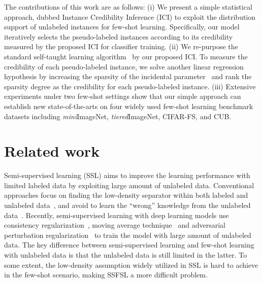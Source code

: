 \documentclass[10pt,letterpaper,twocolumn]{article}
\newcommand{\mypar}[1]{\smallskip\noindent {\bf #1}\enskip}
\begin{document}
The contributions of this work are as follows:
(i) 
We present a simple statistical approach, dubbed Instance Credibility Inference (ICI) to exploit the distribution support of unlabeled instances for few-shot learning. 
Specifically, our model iteratively selects the pseudo-labeled instances according to its credibility measured by the proposed ICI for classifier training.
(ii) 
We re-purpose the standard self-taught learning algorithm~\cite{self-taught-learning} by our proposed ICI. To measure the credibility of each pseudo-labeled instance, we solve another linear regression hypothesis by increasing the sparsity of the incidental parameter~\cite{fan2012partial} and rank the sparsity degree as the credibility for each pseudo-labeled instance.
(iii)
Extensive experiments under two few-shot settings show that our simple approach can establish new state-of-the-arts on four widely used few-shot learning benchmark datasets including \textit{mini}ImageNet, \textit{tiered}ImageNet, CIFAR-FS, and CUB.
\section{Related work}
\mypar{Semi-supervised learning.} 
Semi-supervised learning (SSL) aims to improve the learning performance with limited labeled data by exploiting large amount of unlabeled data.
Conventional approaches focus on finding the low-density separator within both labeled and unlabeled data~\cite{vapnik1998statistical,bennett1999semi,joachims1999transductive},
and avoid to learn the ``wrong'' knowledge from the unlabeled data~\cite{li2014towards}.
Recently, 
semi-supervised learning with deep learning models use consistency regularization~\cite{conf/iclr/LaineA17},
moving average technique~\cite{tarvainen2017mean} and
adversarial perturbation regularization~\cite{miayto2016virtual}
to train the model with large amount of unlabeled data.
The key difference between semi-supervised learning and few-shot learning with unlabeled data is that the unlabeled data is still limited in the latter.
To some extent, the low-density assumption widely utilized in SSL is hard to achieve in the few-shot scenario, making SSFSL a more difficult problem.
\end{document}
